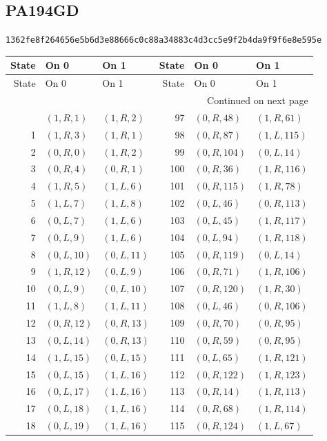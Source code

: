 \subsection{PA194GD}
\noindent\small\texttt{1362fe8f264656e5b6d3e88666c0c88a34883c4d3cc5e9f2b4da9f9f6e8e595e}
\normalsize
\fontsize{9.5}{11}\selectfont
\begin{longtable}{r@{\quad}ll@{\qquad}r@{\quad}ll}
\toprule
State & On 0 & On 1 & State & On 0 & On 1\\
\midrule\endfirsthead
\toprule
State & On 0 & On 1 & State & On 0 & On 1\\
\midrule\endhead
\midrule\multicolumn{6}{r}{Continued on next page}\\\endfoot
\bottomrule\endlastfoot
0 & $(1,R,1)$ & $(1,R,2)$ & 97 & $(0,R,48)$ & $(1,R,61)$\\
1 & $(1,R,3)$ & $(1,R,1)$ & 98 & $(0,R,87)$ & $(1,L,115)$\\
2 & $(0,R,0)$ & $(1,R,2)$ & 99 & $(0,R,104)$ & $(0,L,14)$\\
3 & $(0,R,4)$ & $(0,R,1)$ & 100 & $(0,R,36)$ & $(1,R,116)$\\
4 & $(1,R,5)$ & $(1,L,6)$ & 101 & $(0,R,115)$ & $(1,R,78)$\\
5 & $(1,L,7)$ & $(1,L,8)$ & 102 & $(0,L,46)$ & $(0,R,113)$\\
6 & $(0,L,7)$ & $(1,L,6)$ & 103 & $(0,L,45)$ & $(1,R,117)$\\
7 & $(0,L,9)$ & $(1,L,6)$ & 104 & $(0,L,94)$ & $(1,R,118)$\\
8 & $(0,L,10)$ & $(0,L,11)$ & 105 & $(0,R,119)$ & $(0,L,14)$\\
9 & $(1,R,12)$ & $(0,L,9)$ & 106 & $(0,R,71)$ & $(1,R,106)$\\
10 & $(0,L,9)$ & $(0,L,10)$ & 107 & $(0,R,120)$ & $(1,R,30)$\\
11 & $(1,L,8)$ & $(1,L,11)$ & 108 & $(0,L,46)$ & $(0,R,106)$\\
12 & $(0,R,12)$ & $(0,R,13)$ & 109 & $(0,R,70)$ & $(0,R,95)$\\
13 & $(0,L,14)$ & $(0,R,13)$ & 110 & $(0,R,59)$ & $(0,R,95)$\\
14 & $(1,L,15)$ & $(0,L,15)$ & 111 & $(0,L,65)$ & $(1,R,121)$\\
15 & $(0,L,15)$ & $(1,L,16)$ & 112 & $(0,R,122)$ & $(1,R,123)$\\
16 & $(0,L,17)$ & $(1,L,16)$ & 113 & $(0,R,14)$ & $(1,R,113)$\\
17 & $(0,L,18)$ & $(1,L,16)$ & 114 & $(0,R,68)$ & $(1,R,114)$\\
18 & $(0,L,19)$ & $(1,L,16)$ & 115 & $(0,R,124)$ & $(1,L,67)$\\

\end{longtable}
